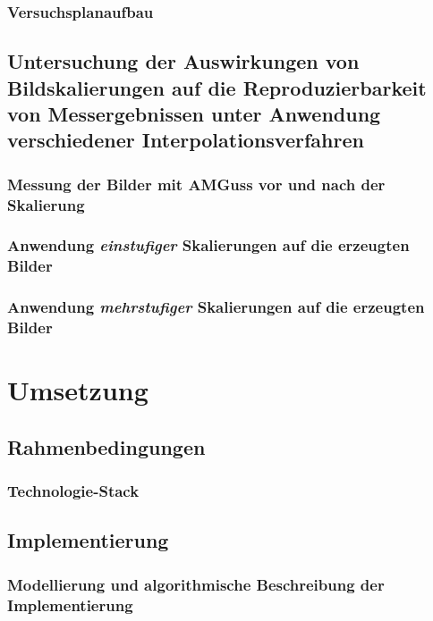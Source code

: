 \documentclass[
fontsize=10pt, 
listof = totoc,
parskip = half	
]{report}
\begin{document}
\subsection{Versuchsplanaufbau}

\section{Untersuchung der Auswirkungen von Bildskalierungen auf die Reproduzierbarkeit von Messergebnissen unter Anwendung verschiedener Interpolationsverfahren}

\subsection{Messung der Bilder mit AMGuss vor und nach der Skalierung}

\subsection{Anwendung \textit{einstufiger} Skalierungen auf die erzeugten Bilder}

\subsection{Anwendung \textit{mehrstufiger} Skalierungen auf die erzeugten Bilder}




\chapter{Umsetzung}

\section{Rahmenbedingungen}

\subsection{Technologie-Stack}

\section{Implementierung}

\subsection{Modellierung und algorithmische Beschreibung der Implementierung}
\end{document}
